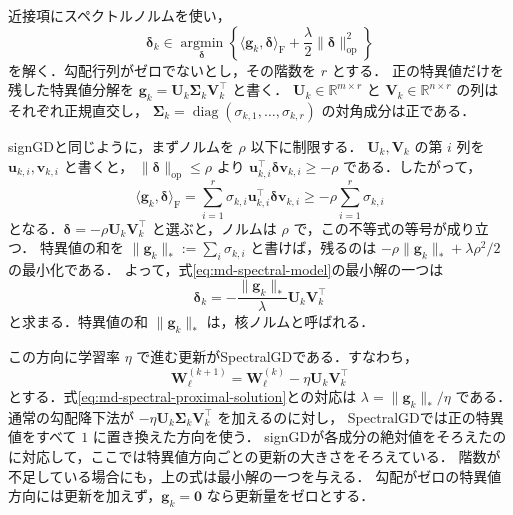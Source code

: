 \documentclass[../main.tex]{subfiles}
\begin{document}
近接項にスペクトルノルムを使い，
\begin{equation}
  \bm{\delta}_k\in\underset{\bm{\delta}}{\operatorname{argmin}}
  \left\{\langle\bm{g}_k,\bm{\delta}\rangle_{\mathrm F}
  +\frac{\lambda}{2}\|\bm{\delta}\|_{\mathrm{op}}^2\right\}
  \label{eq:md-spectral-model}
\end{equation}
を解く．勾配行列がゼロでないとし，その階数を $r$ とする．
正の特異値だけを残した特異値分解を
$\bm{g}_k=\bm{U}_k\bm{\Sigma}_k\bm{V}_k^\top$ と書く．
$\bm{U}_k\in\mathbb{R}^{m\times r}$ と $\bm{V}_k\in\mathbb{R}^{n\times r}$ の列はそれぞれ正規直交し，
$\bm{\Sigma}_k=\operatorname{diag}(\sigma_{k,1},\ldots,\sigma_{k,r})$ の対角成分は正である．

signGDと同じように，まずノルムを $\rho$ 以下に制限する．
$\bm{U}_k,\bm{V}_k$ の第 $i$ 列を $\bm{u}_{k,i},\bm{v}_{k,i}$ と書くと，
$\|\bm{\delta}\|_{\mathrm{op}}\leq\rho$ より
$\bm{u}_{k,i}^\top\bm{\delta}\bm{v}_{k,i}\geq-\rho$ である．したがって，
\begin{equation}
  \langle\bm{g}_k,\bm{\delta}\rangle_{\mathrm F}
  =\sum_{i=1}^r\sigma_{k,i}
  \bm{u}_{k,i}^\top\bm{\delta}\bm{v}_{k,i}
  \geq-\rho\sum_{i=1}^r\sigma_{k,i}
  \label{eq:md-spectral-direction}
\end{equation}
となる．$\bm{\delta}=-\rho\bm{U}_k\bm{V}_k^\top$ と選ぶと，ノルムは $\rho$ で，この不等式の等号が成り立つ．
特異値の和を $\|\bm{g}_k\|_*:=\sum_i\sigma_{k,i}$ と書けば，残るのは
$-\rho\|\bm{g}_k\|_*+\lambda\rho^2/2$ の最小化である．
よって，式\eqref{eq:md-spectral-model}の最小解の一つは
\begin{equation}
  \bm{\delta}_k
  =-\frac{\|\bm{g}_k\|_*}{\lambda}\bm{U}_k\bm{V}_k^\top
  \label{eq:md-spectral-proximal-solution}
\end{equation}
と求まる．特異値の和 $\|\bm{g}_k\|_*$ は，核ノルムと呼ばれる．

この方向に学習率 $\eta$ で進む更新がSpectralGDである．すなわち，
\begin{equation}
  \bm{W}_\ell^{(k+1)}
  =\bm{W}_\ell^{(k)}-\eta\bm{U}_k\bm{V}_k^\top
  \label{eq:md-spectral-gd}
\end{equation}
とする．式\eqref{eq:md-spectral-proximal-solution}との対応は
$\lambda=\|\bm{g}_k\|_*/\eta$ である．
通常の勾配降下法が $-\eta\bm{U}_k\bm{\Sigma}_k\bm{V}_k^\top$ を加えるのに対し，
SpectralGDでは正の特異値をすべて $1$ に置き換えた方向を使う．
signGDが各成分の絶対値をそろえたのに対応して，ここでは特異値方向ごとの更新の大きさをそろえている．
階数が不足している場合にも，上の式は最小解の一つを与える．
勾配がゼロの特異値方向には更新を加えず，$\bm{g}_k=\bm{0}$ なら更新量をゼロとする．
\end{document}
